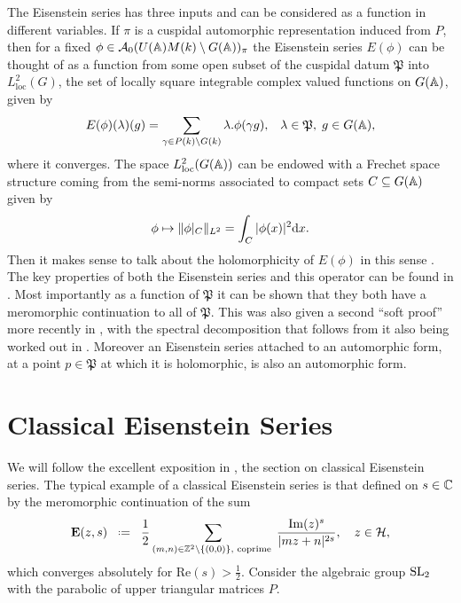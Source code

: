 The Eisenstein series has three inputs and can be considered as a function in different variables. If \(\pi\) is a cuspidal automorphic representation induced from \(P\), then for a fixed \(\phi \in\mathcal{A}_0(U(\A)M(k)\setminus G(\A))_\pi \) the Eisenstein series \(E(\phi)\) can be thought of as a function from some open subset of the cuspidal datum \(\mathfrak{P}\) into \(L^2_{\mathrm{loc}}(G)\), the set of locally square integrable complex valued functions on \(G(\A)\), given by 
\[E(\phi)(\lambda)(g) = \sum_{\gamma \in P(k)\backslash G(k)} \lambda.\phi(\gamma g), \;\;\; \lambda\in \mathfrak{P},\; g\in G(\A),\]
where it converges. The space \(L^2_{\mathrm{loc}}(G(\A))\) can be endowed with a Frechet space structure coming from the semi-norms associated to compact sets \(C\subseteq G(\A)\) given by 
\[\phi \mapsto \norm{\phi|_C}_{L^2} = \int_C |\phi(x)|^2 \mathrm{d}x.\] 
Then it makes sense to talk about the holomorphicity of \(E(\phi)\) in this sense \cite[I.4.9]{moeglinSpectralDecompositionEisenstein1995}. The key properties of both the Eisenstein series and this operator can be found in \cite[IV.1.8, IV.1.9, IV.1.10, IV.1.11]{moeglinSpectralDecompositionEisenstein1995}. Most importantly as a function of \(\mathfrak{P}\) it can be shown that they both have a meromorphic continuation to all of \(\mathfrak{P}\). This was also given a second ``soft proof'' more recently in \cite{bernsteinMeromorphicContinuationEisenstein2023}, with the spectral decomposition that follows from it also being worked out in \cite{delormeSpectralTheoremLanglands2021}. Moreover an Eisenstein series attached to an automorphic form, at a point \(p\in \mathfrak{P}\) at which it is holomorphic, is also an automorphic form. 

\section{Classical Eisenstein Series}\label{sec:classic-eisenstein}

We will follow the excellent exposition in \cite{garrettTransitionEisensteinSeries2016}, the section \cite[1.2]{bruinier123ModularForms2008} on classical Eisenstein series. The typical example of a classical Eisenstein series is that defined on \(s\in \C\) by the meromorphic continuation of the sum
\[\mathbf{E}(z, s) \defeq \frac{1}{2} \sum_{(m,n)\in \Z^2\setminus \{(0,0)\}, \text{ coprime }} \frac{\mathrm{Im}(z)^{s}}{|mz+n|^{2s}}, \quad z\in \mathcal{H},\]
which converges absolutely for \(\mathrm{Re}(s)>\frac{1}{2}\). Consider the algebraic group \(\operatorname{SL}_2\) with the parabolic of upper triangular matrices \(P\).

